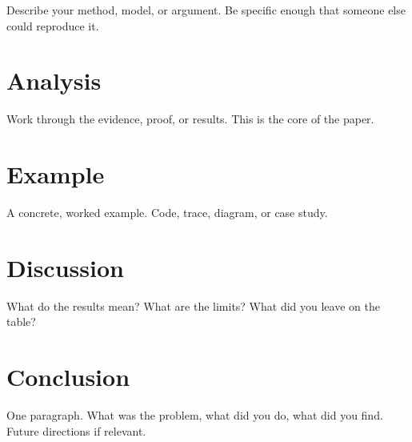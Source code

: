 \documentclass[12pt,a4paper]{article}
\begin{document}
Describe your method, model, or argument. Be specific enough
that someone else could reproduce it.

\section{Analysis}

Work through the evidence, proof, or results. This is the
core of the paper.

\section{Example}

A concrete, worked example. Code, trace, diagram, or case study.

\section{Discussion}

What do the results mean? What are the limits? What did you
leave on the table?

\section{Conclusion}

One paragraph. What was the problem, what did you do, what
did you find. Future directions if relevant.

\printbibliography

\end{document}

